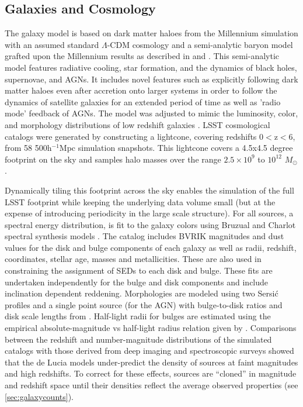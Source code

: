 \documentclass[]{article}
\begin{document}
{\subsection{Galaxies and Cosmology \label{sec:gal}}

The galaxy model is based on dark matter haloes from the Millennium
simulation \citep{springel05} with an assumed standard $\Lambda$-CDM
cosmology and a semi-analytic baryon model grafted upon the Millennium
results as described in \citet{springel05} and \citet{delucia}. This
semi-analytic model features radiative cooling, star formation, and
the dynamics of black holes, supernovae, and AGNs. It includes
novel features such as explicitly following dark matter haloes even
after accretion onto larger systems in order to follow the dynamics of
satellite galaxies for an extended period of time as well as 'radio
mode' feedback of AGNs. The model was adjusted to mimic the
luminosity, color, and morphology distributions of low redshift
galaxies \citep{delucia}. LSST cosmological catalogs were generated
by constructing a lightcone, covering redshifts 0$<$z$<$6, from 58
500h$^{-1}$Mpc simulation snapshots. This lightcone covers a 4.5x4.5
degree footprint on the sky and samples halo masses over the range
$2.5\times10^9$ to $10^{12}$ $M_\odot$. 

Dynamically tiling this footprint across the sky enables the
simulation of the full LSST footprint while keeping the underlying
data volume small (but at the expense of introducing periodicity in
the large scale structure).  For all sources, a spectral energy
distribution, is fit to the galaxy colors using Bruzual and Charlot
spectral synthesis models \citep{bruzual}. The
\citet{delucia} catalog includes BVRIK magnitudes and dust values for
the disk and bulge components of each galaxy as well as radii,
redshift, coordinates, stellar age, masses and metallicities. These
are also used in constraining the assignment of SEDs to each disk and bulge.
These fits are undertaken independently for the bulge and disk components and
include inclination dependent reddening. Morphologies are modeled using two
Sersi{\'c} profiles and a single point source (for the AGN) with
bulge-to-disk ratios and disk scale lengths from \citet{delucia}.
 Half-light radii for bulges are estimated using the empirical
absolute-magnitude vs half-light radius relation given by 
\citet{gonzalez09}.  Comparisons between the redshift and
number-magnitude distributions of the simulated catalogs with those
derived from deep imaging and spectroscopic surveys showed that the de
Lucia models under-predict the density of sources at faint magnitudes
and high redshifts. To correct for these effects, sources are
``cloned'' in magnitude and redshift space until their densities
reflect the average observed properties (see
\ref{sec:galaxycounts}). 

}
\end{document}
